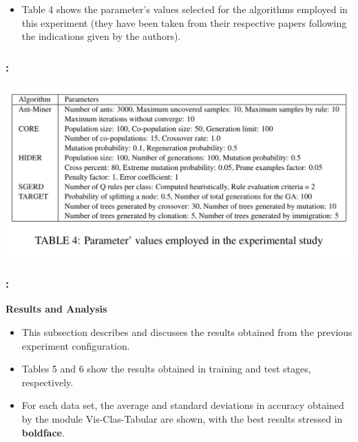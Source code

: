 \documentclass{beamer}
\begin{document}
\begin{CJK*}{UTF8}{bsmi}
\begin{frame}
	\begin{itemize}
		\item Table 4 shows the parameter’s values selected for the algorithms employed in this experiment (they have been taken from their respective papers following the indications given by the authors).
	\end{itemize}
	
	
\end{frame}

\begin{frame}
	\frametitle{\insertsection : \insertsubsection}
	
	\begin{center}
		\includegraphics[width=1\linewidth]{./9.png}
	\end{center}
\end{frame}


\begin{frame}
	\frametitle{\insertsection : \insertsubsection}
	\textbf{Results and Analysis}
	
	\begin{itemize}
		\item This subsection describes and discusses the results obtained from the previous experiment configuration.
		\item Tables 5 and 6 show the results obtained in training and test stages, respectively. 
		\item For each data set, the average and standard deviations in accuracy obtained by the module Vis-Clas-Tabular are shown, with the best results stressed in \textbf{boldface}.
	\end{itemize}
	
	
\end{frame}


\end{CJK*}
\end{document}
